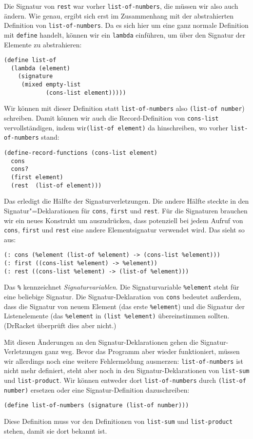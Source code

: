 Die Signatur von \lstinline{rest} war vorher
\lstinline{list-of-numbers}, die müssen wir also auch ändern.  Wie
genau, ergibt sich erst im Zusammenhang mit der abstrahierten
Definition von \lstinline{list-of-numbers}.  Da es sich hier um eine
ganz normale Definition mit \lstinline{define} handelt, können wir ein
\lstinline{lambda} einführen, um über den Signatur der Elemente zu
abstrahieren:
%
\begin{lstlisting}
(define list-of
  (lambda (element)
    (signature
     (mixed empty-list
            (cons-list element)))))
\end{lstlisting}
%
Wir können mit dieser Definition statt \lstinline{list-of-numbers} also
\lstinline{(list-of number}) schreiben.  Damit können wir auch die
Record-Definition von \lstinline{cons-list} vervollständigen, indem
wir\linebreak[4]\lstinline{(list-of element)} da hinschreiben, wo vorher
\lstinline{list-of-numbers} stand:
%
\begin{lstlisting}
(define-record-functions (cons-list element)
  cons
  cons?
  (first element)
  (rest  (list-of element)))
\end{lstlisting}
%
Das erledigt die Hälfte der Signaturverletzungen.  Die andere Hälfte
steckte in den Signatur"=Deklarationen für \lstinline{cons},
\lstinline{first} und \lstinline{rest}.  Für die Signaturen brauchen
wir ein neues Konstrukt um auszudrücken, dass potenziell bei jedem
Aufruf von \lstinline{cons}, \lstinline{first} und \lstinline{rest}
eine andere Elementsignatur verwendet wird.  Das sieht so aus:
%
\begin{lstlisting}
(: cons (%element (list-of %element) -> (cons-list %element)))
(: first ((cons-list %element) -> %element))
(: rest ((cons-list %element) -> (list-of %element)))
\end{lstlisting}
%
Das \verb|%| kennzeichnet
\textit{Signaturvariablen}.  Die
Signaturvariable \lstinline{%element} steht für eine beliebige
Signatur.  Die Signatur-Deklaration von \lstinline{cons} bedeutet
außerdem, dass die Signatur von neuem Element (das erste \lstinline{%element})
und die Signatur der Listenelemente (das \lstinline{%element} in 
\lstinline{(list %element)} übereinstimmen sollten.  (DrRacket
  überprüft dies aber nicht.)

Mit diesen Änderungen an den Signatur-Deklarationen gehen die
Signatur-Verletzungen ganz weg.  Bevor das Programm aber wieder
funktioniert, müssen wir allerdings noch eine weitere Fehlermeldung
ausmerzen: \lstinline{list-of-numbers} ist nicht mehr
definiert, steht aber noch in den Signatur-Deklarationen von
\lstinline{list-sum} und \lstinline{list-product}.  Wir können
entweder dort \lstinline{list-of-numbers} durch \lstinline{(list-of number)}
ersetzen oder eine Signatur-Definition
dazuschreiben:
%
\begin{lstlisting}
(define list-of-numbers (signature (list-of number)))
\end{lstlisting}
%
Diese Definition muss vor den Definitionen von \lstinline{list-sum}
und \lstinline{list-product} stehen, damit sie dort bekannt ist.

